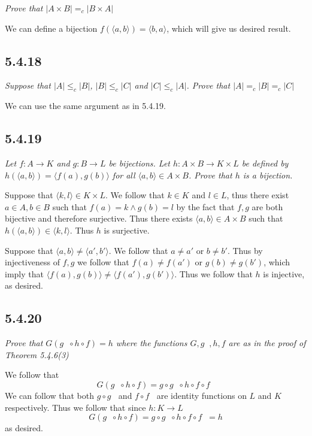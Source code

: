 \documentclass[11pt,oneside,titlepage]{book}
\DeclareMathOperator \inv {^{-1}}
\newcommand{\eangle}[1]{\langle #1 \rangle}
\begin{document}
\textit{Prove that $|A \times B| =_c |B \times A|$}

We can define a bijection $f(\eangle{a, b}) = \eangle{b, a}$, which will give us desired result.

\subsection*{5.4.18}

\textit{Suppose that $|A| \leq_c |B|$, $|B| \leq_c |C|$ and $|C| \leq_c |A|$. Prove
  that $|A| =_c |B| =_c |C|$}

We can use the same argument as in 5.4.19.

\subsection*{5.4.19}

\textit{Let $f: A \to K$ and $g: B \to L$ be bijections. Let $h: A \times B \to K \times L$
  be defined by $h(\eangle{a, b}) = \eangle{f(a), g(b)}$ for all $\eangle{a, b} \in A \times B$.
  Prove that $h$ is a bijection.}

Suppose that $\eangle{k, l} \in K \times L$. We follow that $k \in K$ and $l \in L$, thus
there exist $a \in A, b \in B$ such that $f(a) = k \land g(b) = l$ by the fact
that $f, g$ are both bijective and therefore surjective. Thus there exists
$\eangle{a, b} \in A \times B$ such that $h(\eangle{a, b}) \in \eangle{k, l}$. Thus $h$
is surjective.

Suppose that $\eangle{a, b} \neq \eangle{a', b'}$. We follow that $a \neq a'$ or $b \neq b'$.
Thus by injectiveness of $f, g$ we follow that $f(a) \neq f(a')$ or $g(b) \neq g(b')$, which imply
that $\eangle{f(a), g(b)} \neq \eangle{f(a'), g(b')}$. Thus we follow that $h$ is injective,
as desired.

\subsection*{5.4.20}

\textit{ Prove that $G(g\inv \circ h \circ f) = h$ where the functions $G, g\inv, h, f$ are
  as in the proof of Theorem 5.4.6(3) }

We follow that
$$G(g\inv \circ h \circ f) = g \circ g\inv \circ h \circ f \circ f\inv $$
We can follow that both $g \circ g\inv$ and $f \circ f\inv$ are identity functions on
$L$ and $K$ respectively. Thus we follow that since $h: K \to L$
$$G(g\inv \circ h \circ f) = g \circ g\inv \circ h \circ f \circ f\inv = h$$
as desired.
\end{document}
